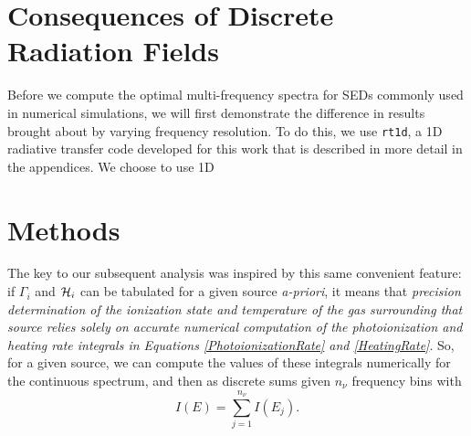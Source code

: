 \documentclass[preprint2]{aastex}              %
\begin{document}

\section{Consequences of Discrete Radiation Fields}
Before we compute the optimal multi-frequency spectra for SEDs commonly used in numerical simulations, we will first demonstrate the difference in results brought about by varying frequency resolution.  To do this, we use \texttt{rt1d}, a 1D radiative transfer code developed for this work that is described in more detail in the appendices.  We choose to use 1D 











\section{Methods}
The key to our subsequent analysis was inspired by this same convenient feature: if $\Gamma_i$ and $\mathcal{H}_i$ can be tabulated for a given source \textit{a-priori}, it means that \textit{precision determination of the ionization state and temperature of the gas surrounding that source relies solely on accurate numerical computation of the photoionization and heating rate integrals in Equations \ref{PhotoionizationRate} and \ref{HeatingRate}}.  So, for a given source, we can compute the values of these integrals numerically for the continuous spectrum, and then as discrete sums given $n_{\nu}$ frequency bins with 
\begin{equation}
    I(E) = \sum_{j=1}^{n_{\nu}} I(E_j) .
\end{equation}
\end{document}
